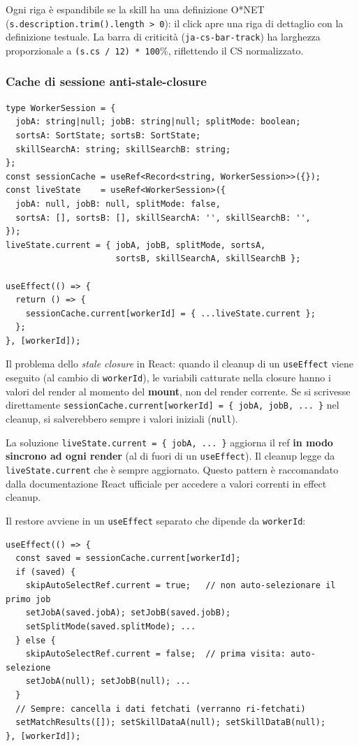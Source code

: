 \documentclass[a4paper,12pt]{article}
\begin{document}
Ogni riga \`{e} espandibile se la skill ha una definizione O*NET
(\texttt{s.description.trim().length > 0}): il click apre una riga
di dettaglio con la definizione testuale. La barra di criticit\`{a}
(\texttt{ja-cs-bar-track}) ha larghezza proporzionale a
\texttt{(s.cs / 12) * 100}\%, riflettendo il CS normalizzato.

\subsubsection{Cache di sessione anti-stale-closure}
\vspace{2pt}
\begin{lstlisting}
type WorkerSession = {
  jobA: string|null; jobB: string|null; splitMode: boolean;
  sortsA: SortState; sortsB: SortState;
  skillSearchA: string; skillSearchB: string;
};
const sessionCache = useRef<Record<string, WorkerSession>>({});
const liveState    = useRef<WorkerSession>({
  jobA: null, jobB: null, splitMode: false,
  sortsA: [], sortsB: [], skillSearchA: '', skillSearchB: '',
});
liveState.current = { jobA, jobB, splitMode, sortsA,
                      sortsB, skillSearchA, skillSearchB };

useEffect(() => {
  return () => {
    sessionCache.current[workerId] = { ...liveState.current };
  };
}, [workerId]);
\end{lstlisting}

\noindent Il problema dello \textit{stale closure} in React: quando il cleanup
di un \texttt{useEffect} viene eseguito (al cambio di \texttt{workerId}),
le variabili catturate nella closure hanno i valori del render al momento
del \textbf{mount}, non del render corrente. Se si scrivesse direttamente
\texttt{sessionCache.current[workerId] = \{ jobA, jobB, ... \}} nel
cleanup, si salverebbero sempre i valori iniziali (\texttt{null}).

La soluzione \texttt{liveState.current = \{ jobA, ... \}} aggiorna
il ref \textbf{in modo sincrono ad ogni render} (al di fuori di un
\texttt{useEffect}). Il cleanup legge da \texttt{liveState.current}
che \`{e} sempre aggiornato. Questo pattern \`{e} raccomandato dalla
documentazione React ufficiale per accedere a valori correnti in
effect cleanup.

Il restore avviene in un \texttt{useEffect} separato che dipende da
\texttt{workerId}:
\begin{lstlisting}
useEffect(() => {
  const saved = sessionCache.current[workerId];
  if (saved) {
    skipAutoSelectRef.current = true;   // non auto-selezionare il primo job
    setJobA(saved.jobA); setJobB(saved.jobB);
    setSplitMode(saved.splitMode); ...
  } else {
    skipAutoSelectRef.current = false;  // prima visita: auto-selezione
    setJobA(null); setJobB(null); ...
  }
  // Sempre: cancella i dati fetchati (verranno ri-fetchati)
  setMatchResults([]); setSkillDataA(null); setSkillDataB(null);
}, [workerId]);
\end{lstlisting}
\end{document}
